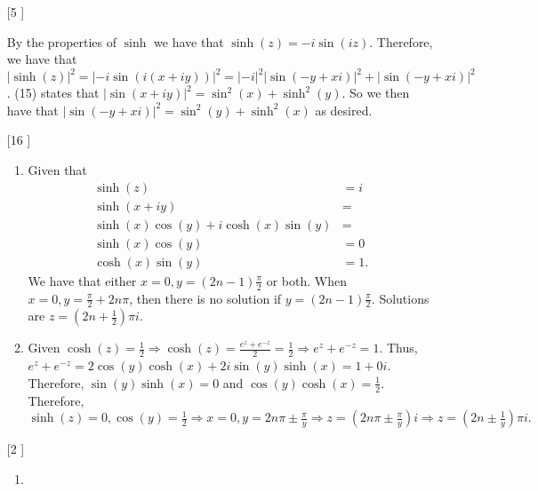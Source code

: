 \documentclass{article}
\theoremstyle{definition}
\begin{document}
\begin{enumerate}
\begin{enumerate}
    \end{enumerate}
    
    \item [[\phantom{-}5]]
    
    By the properties of $\sinh$ we have that $\sinh(z) = -i\sin(iz).$ Therefore, we have that $|\sinh(z)|^2 = |-i\sin(i(x + iy))|^2 = |-i|^2|\sin(-y + xi)|^2 + |\sin(-y + xi)|^2$. (15) states that $|\sin(x + iy)|^2 = \sin^2(x) + \sinh^2(y)$. So we then have that $|\sin(-y + xi)|^2 = \sin^2(y) + \sinh^2(x)$ as desired. 
    
    \item [[\phantom{-}16]]
    
    \begin{enumerate}
        \item 
        
        Given that \begin{align*}
            \sinh(z) &= i\\
            \sinh(x + iy) &=\\
            \sinh(x)\cos(y) + i\cosh(x)\sin(y) &=\\
            \sinh(x)\cos(y) &= 0\\
            \cosh(x)\sin(y) &= 1.
        \end{align*} We have that either $x = 0, y = (2n - 1)\frac{\pi}{2}$ or both. When $x = 0, y = \frac{\pi}{2} + 2n\pi$, then there is no solution if $y = (2n - 1)\frac{\pi}{2}$. Solutions are $z = (2n + \frac{1}{2})\pi i.$
        
        \item
        
        Given $\cosh(z) = \frac{1}{2} \Rightarrow \cosh(z) = \frac{e^z + e^{-z}}{2} = \frac{1}{2} \Rightarrow e^z + e^{-z} = 1$. Thus, $e^z + e^{-z} = 2\cos(y)\cosh(x) + 2i\sin(y)\sinh(x) = 1 + 0i$. Therefore, $\sin(y)\sinh(x) = 0$ and $\cos(y)\cosh(x) = \frac{1}{2}$. Therefore, $\sinh(z) = 0, \cos(y) = \frac{1}{2} \Rightarrow x = 0, y = 2n\pi \pm \frac{\pi}{y} \Rightarrow z = (2n\pi \pm \frac{\pi}{y})i \Rightarrow z = (2n \pm \frac{1}{y})\pi i.$
        
    \end{enumerate}
    
    \item [[\phantom{-}2]]
    
    \begin{enumerate}
        \item 
        

\end{enumerate}
\end{enumerate}
\end{document}
